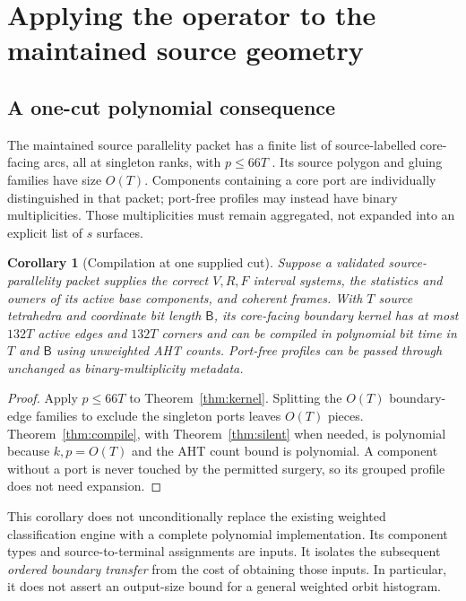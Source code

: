 \documentclass[11pt]{article}
\newtheorem{corollary}[theorem]{Corollary}
\theoremstyle{definition}
\theoremstyle{remark}\newtheorem{remark}[theorem]{Remark}
\newcommand{\bits}{\mathsf B}
\begin{document}
\section{Applying the operator to the maintained source geometry}
\label{sec:integration}

\subsection{A one-cut polynomial consequence}
The maintained source parallelity packet has a finite list of source-labelled core-facing arcs, all at singleton ranks, with $p\le66T$ \cite{parallelity}. Its source polygon and gluing families have size $O(T)$. Components containing a core port are individually distinguished in that packet; port-free profiles may instead have binary multiplicities. Those multiplicities must remain aggregated, not expanded into an explicit list of $s$ surfaces.

\begin{corollary}[Compilation at one supplied cut]\label{cor:onecut}
Suppose a validated source-parallelity packet supplies the correct $V,R,F$ interval systems, the statistics and owners of its active base components, and coherent frames. With $T$ source tetrahedra and coordinate bit length $\bits$, its core-facing boundary kernel has at most $132T$ active edges and $132T$ corners and can be compiled in polynomial bit time in $T$ and $\bits$ using unweighted AHT counts. Port-free profiles can be passed through unchanged as binary-multiplicity metadata.
\end{corollary}
\begin{proof}
Apply $p\le66T$ to Theorem~\ref{thm:kernel}. Splitting the $O(T)$ boundary-edge families to exclude the singleton ports leaves $O(T)$ pieces. Theorem~\ref{thm:compile}, with Theorem~\ref{thm:silent} when needed, is polynomial because $k,p=O(T)$ and the AHT count bound is polynomial. A component without a port is never touched by the permitted surgery, so its grouped profile does not need expansion.
\end{proof}

This corollary does not unconditionally replace the existing weighted classification engine with a complete polynomial implementation. Its component types and source-to-terminal assignments are inputs. It isolates the subsequent \emph{ordered boundary transfer} from the cost of obtaining those inputs. In particular, it does not assert an output-size bound for a general weighted orbit histogram.
\end{document}
